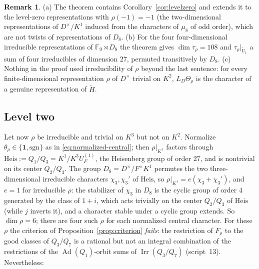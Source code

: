 \documentclass[11pt]{article}
\newcommand{\Fq}{\mathbb F}
\newcommand{\Irr}{\operatorname{Irr}}
\newcommand{\Ad}{\operatorname{Ad}}
\newcommand{\tH}{\widetilde H}
\newcommand{\tU}{\widetilde U}
\theoremstyle{plain}
\theoremstyle{definition}
\newtheorem{remark}[theorem]{Remark}
\begin{document}
\begin{remark}
(a) The theorem contains Corollary~\ref{cor:levelzero} and extends it to
the level-zero representations with $\rho(-1)=-1$ (the two-dimensional
representations of $D^\times/K^1$ induced from the characters of
$\mu_8$ of odd order), which are not twists of representations of $D_8$.
(b) For the four four-dimensional irreducible representations of
$\Fq_9\rtimes D_8$ the theorem gives $\dim\tau_\rho=108$ and
$\tau_\rho|_{\tU_1}$ a sum of four irreducibles of dimension $27$,
permuted transitively by $D_8$.
(c) Nothing in the proof used irreducibility of $\rho$ beyond the last
sentence: for every finite-dimensional representation $\rho$ of
$D^\times$ trivial on $K^2$, $L_D\Theta_\rho$ is the character of a
genuine representation of $\tH$.
\end{remark}

\subsection{Level two}\label{subsec:targetB}
Let now $\rho$ be irreducible and trivial on $K^3$ but not on $K^2$.
Normalize $\theta_\rho\in\{\mathbf1,\mathrm{sgn}\}$ as in
\eqref{eq:normalized-central}; then $\rho|_{K^1}$ factors through
$\mathrm{Heis}:=Q_1/Q_3=K^1/K^3U_F^{(1)}$, the Heisenberg group of order
$27$, and is nontrivial on its center $Q_2/Q_3$.  The group
$D_8=D^\times/F^\times K^1$ permutes the two three-dimensional
irreducible characters $\chi_3,\chi_3'$ of $\mathrm{Heis}$, so
$\rho|_{K^1}=e(\chi_3+\chi_3')$, and $e=1$ for irreducible $\rho$: the
stabilizer of $\chi_3$ in $D_8$ is the cyclic group of order $4$
generated by the class of $1+i$, which acts trivially on the center
$Q_2/Q_3$ of $\mathrm{Heis}$ (while $j$ inverts it), and a character
stable under a cyclic group extends.  So $\dim\rho=6$; there are four such $\rho$ for each normalized central
character.  For these $\rho$ the criterion of
Proposition~\ref{prop:criterion} \emph{fails}: the restriction of
$F_\rho$ to the good classes of $Q_3/Q_7$ is a rational but not an
integral combination of the restrictions of the $\Ad(Q_1)$-orbit sums of
$\Irr(Q_3/Q_7)$ (script~13).  Nevertheless:
\end{document}
